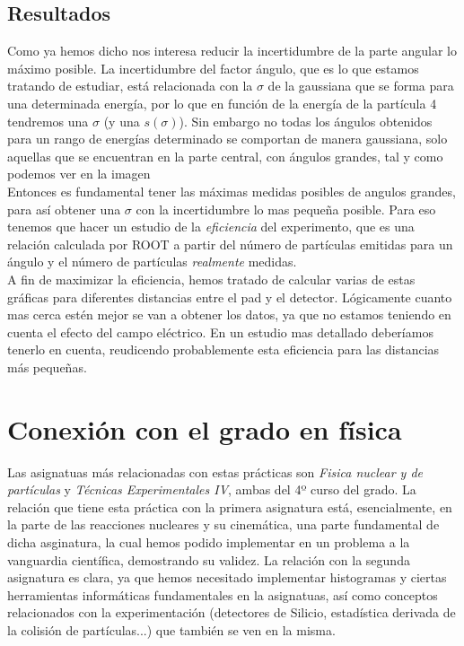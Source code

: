 \documentclass[12pt,a4paper]{article}
\numberwithin{equation}{section}
\numberwithin{figure}{section}
\begin{document}

\subsection{Resultados}

Como ya hemos dicho nos interesa reducir la incertidumbre de la parte angular lo máximo posible. La incertidumbre del factor ángulo, que es lo que estamos tratando de estudiar, está relacionada con la $\sigma$ de la gaussiana que se forma para una determinada energía, por lo que en función de la energía de la partícula 4 tendremos una $\sigma$ (y una $s(\sigma)$). Sin embargo no todas los ángulos obtenidos para un rango de energías determinado se comportan de manera gaussiana, solo aquellas que se encuentran en la parte central, con ángulos grandes, tal y como podemos ver en la imagen \\


Entonces es fundamental tener las máximas medidas posibles de angulos grandes, para así obtener una $\sigma$ con la incertidumbre lo mas pequeña posible. Para eso tenemos que hacer un estudio de la {\it eficiencia} del experimento, que es una relación calculada por ROOT a partir del número de partículas emitidas para un ángulo y el número de partículas {\it realmente} medidas. \\

A fin de maximizar la eficiencia, hemos tratado de calcular varias de estas gráficas para diferentes distancias entre el pad y el detector. Lógicamente cuanto mas cerca estén mejor se van a obtener los datos, ya que no estamos teniendo en cuenta el efecto del campo eléctrico. En un estudio mas detallado deberíamos tenerlo en cuenta, reudicendo probablemente esta eficiencia para las distancias más pequeñas. 



\section{Conexión con el grado en física}

Las asignatuas más relacionadas con estas prácticas son {\it Fisica nuclear y de partículas} y {\it Técnicas Experimentales IV}, ambas del 4º curso del grado. La relación que tiene esta práctica con la primera asignatura está, esencialmente, en la parte de las reacciones nucleares y su cinemática, una parte fundamental de dicha asginatura, la cual hemos podido implementar en un problema a la vanguardia científica, demostrando su validez. La relación con la segunda asignatura es clara, ya que hemos necesitado implementar histogramas y ciertas herramientas informáticas fundamentales en la asignatuas, así como conceptos relacionados con la experimentación (detectores de Silicio, estadística derivada de la colisión de partículas...) que también se ven en la misma. 
\end{document}
